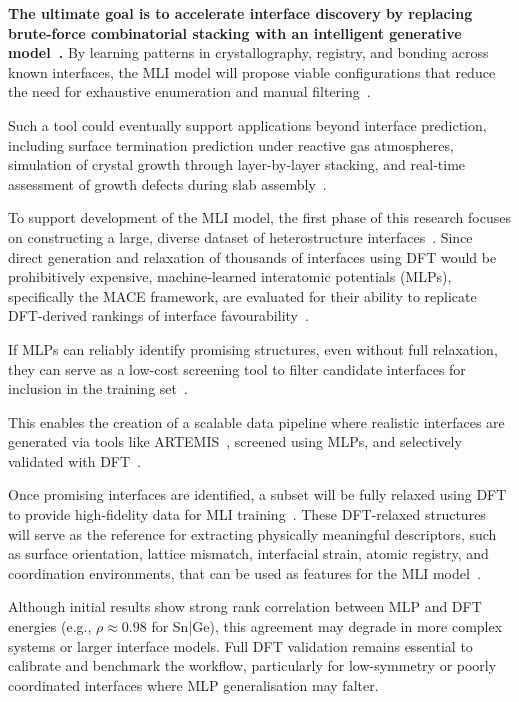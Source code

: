 \label{objectives_mli_pipeline} \textbf{The ultimate goal is to accelerate interface discovery by replacing brute-force combinatorial stacking with an intelligent generative model~\nocite{}.}
By learning patterns in crystallography, registry, and bonding across known interfaces, the MLI model will propose viable configurations that reduce the need for exhaustive enumeration and manual filtering~\nocite{}.

\label{objectives_mli_extended_use} Such a tool could eventually support applications beyond interface prediction, including surface termination prediction under reactive gas atmospheres, simulation of crystal growth through layer-by-layer stacking, and real-time assessment of growth defects during slab assembly~\nocite{}.

\label{objectives_dataset_building} To support development of the MLI model, the first phase of this research focuses on constructing a large, diverse dataset of heterostructure interfaces~\nocite{}.
Since direct generation and relaxation of thousands of interfaces using DFT would be prohibitively expensive, machine-learned interatomic potentials (MLPs), specifically the MACE framework, are evaluated for their ability to replicate DFT-derived rankings of interface favourability~\cite{Batatia2022-xz}.

\label{objectives_screening_workflow} %

If MLPs can reliably identify promising structures, even without full relaxation, they can serve as a low-cost screening tool to filter candidate interfaces for inclusion in the training set~\nocite{}.

This enables the creation of a scalable data pipeline where realistic interfaces are generated via tools like ARTEMIS~\cite{Taylor2020-nl},
screened using MLPs, and selectively validated with DFT~\nocite{}.

\newpage \label{objectives_dft_validation} Once promising interfaces are identified, a subset will be fully relaxed using DFT to provide high-fidelity data for MLI training~\nocite{}.
These DFT-relaxed structures will serve as the reference for extracting physically meaningful descriptors, such as surface orientation, lattice mismatch, interfacial strain, atomic registry, and coordination environments, that can be used as features for the MLI model~\cite{Gouveia2025-fpml}.

\label{objectives_dft_mlp_comparison} Although initial results show strong rank correlation between MLP and DFT energies (e.g., $\rho \approx 0.98$ for Sn|Ge), this agreement may degrade in more complex systems or larger interface models.
Full DFT validation remains essential to calibrate and benchmark the workflow, particularly for low-symmetry or poorly coordinated interfaces where MLP generalisation may falter.

